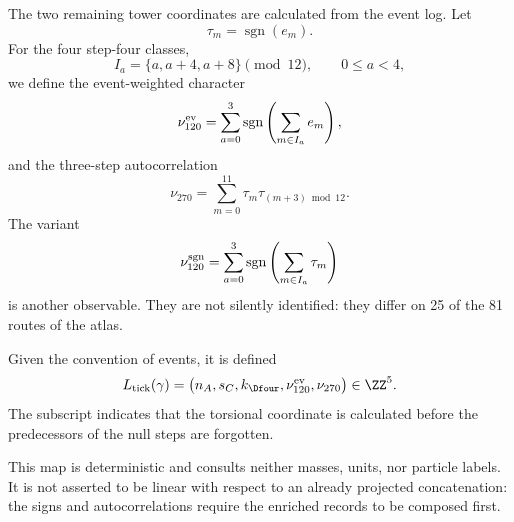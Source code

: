 The two remaining tower coordinates are calculated from the event log. Let
\[
 \tau_m=\operatorname{sgn}(e_m).
\]
For the four step-four classes,
\[
 I_a=\{a,a+4,a+8\}\pmod{12},
 \qquad 0\leq a<4,
\]
we define the event-weighted character
\[
 \nu_{120}^{\rm ev}
 =\sum_{a=0}^{3}\operatorname{sgn}
 \left(\sum_{m\in I_a}e_m\right),
\]
and the three-step autocorrelation
\[
 \nu_{270}=\sum_{m=0}^{11}\tau_m\tau_{(m+3)\bmod12}.
\]
The variant
\[
 \nu_{120}^{\rm sgn}
 =\sum_{a=0}^{3}\operatorname{sgn}
 \left(\sum_{m\in I_a}\tau_m\right)
\]
is another observable. They are not silently identified: they differ on
25 of the 81 routes of the atlas.

\begin{definition}
Given the convention of events, it is defined
\[
 L_{\rm tick}(\gamma)=
 \bigl(n_A,s_C,k_{\Dfour},\nu_{120}^{\rm ev},\nu_{270}\bigr)
 \in\ZZ^5.
\]
The subscript indicates that the torsional coordinate is calculated before
the predecessors of the null steps are forgotten.
\end{definition}

This map is deterministic and consults neither masses, units, nor particle
labels. It is not asserted to be linear with respect to an already projected
concatenation: the signs and autocorrelations require the enriched
records to be composed first.
